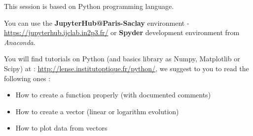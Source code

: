 This session is based on Python programming language.

You can use the \textbf{JupyterHub@Paris-Saclay} environment - 
\href{https://jupyterhub.ijclab.in2p3.fr/}{https://jupyterhub.ijclab.in2p3.fr/} or \textbf{Spyder} development environment from \textit{Anaconda}.

You will find tutorials on Python (and basics library as Numpy, Matplotlib or Scipy) at : \href{http://lense.institutoptique.fr/python/}{http://lense.institutoptique.fr/python/}, we suggest to you to read the following ones :

\begin{itemize}
	\item How to create a function properly (with documented comments)
	\item How to create a vector (linear or logarithm evolution)
	\item How to plot data from vectors 
\end{itemize}
